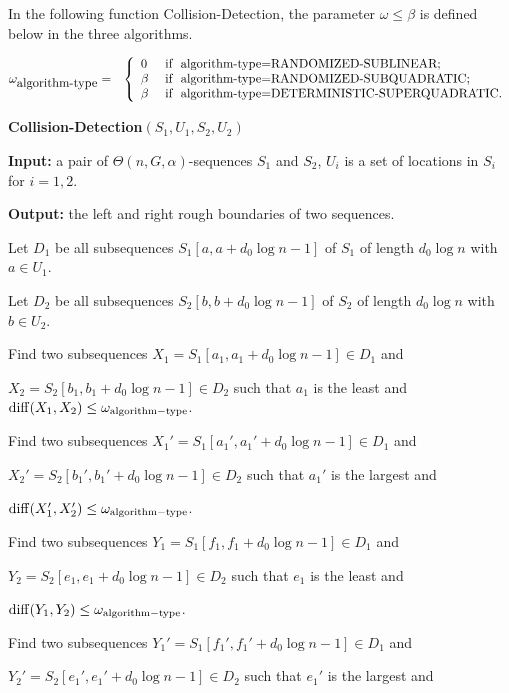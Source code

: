 \documentclass[11pt]{article}
\newcommand{\diff}{{\rm diff}}
\newcommand{\algtype}{{\rm algorithm-type}}
\newcommand{\sublinear}{{\rm RANDOMIZED-SUBLINEAR}}
\newcommand{\randomized}{{\rm RANDOMIZED-SUBQUADRATIC}}
\newcommand{\deterministic}{{\rm DETERMINISTIC-SUPERQUADRATIC}}
\begin{document}
In the following function Collision-Detection, the parameter
$\omega\le \beta$ is defined below in the three  algorithms.

\begin{eqnarray}
\omega_{\mbox{\algtype}}&=& \left\{ \begin{array}{ll}
                0 & \mbox{\ if \ } \mbox{\algtype=\sublinear;}\\
                \beta & \mbox{\ if \ }\mbox{\algtype=\randomized;}\\
                 \beta & \mbox{\ if \ }\mbox{\algtype=\deterministic.}\\
          \end{array}
          \right.
\end{eqnarray}

\vskip 10pt {\bf Collision-Detection$(S_1, U_1, S_2, U_2)$}

{\bf Input:} a pair of $\Theta(n,G,\alpha)$-sequences $S_1$ and
$S_2$, $U_i$ is a set of locations in $S_i$ for $i=1,2$.


{\bf Output:} the left and right rough boundaries of two sequences.


\qquad Let $D_1$ be all subsequences $S_1[a,a+d_0\log n-1]$ of $S_1$
of length $d_0\log n$ with $a\in U_1$.

\qquad Let $D_2$ be all subsequences $S_2[b,b+d_0\log n-1]$ of $S_2$
of length $d_0\log n$ with $b\in U_2$.



\qquad Find two  subsequences $X_1=S_1[a_1,a_1+d_0\log n-1]\in D_1$
and

\qquad $X_2=S_2[b_1,b_1+d_0\log n-1]\in D_2$ such that $a_1$ is the
least and $\diff(X_1,X_2)\le \omega_{\algtype}$.

\qquad Find two subsequences $X_1'=S_1[a_1',a_1'+d_0\log n-1]\in
D_1$ and

\qquad $X_2'=S_2[b_1',b_1'+d_0\log n-1]\in D_2$ such that $a_1'$ is
the largest and

\qquad $\diff(X_1',X_2')\le \omega_{\algtype}$.

\qquad Find two  subsequences $Y_1=S_1[f_1,f_1+d_0\log n-1]\in D_1$
and

\qquad $Y_2=S_2[e_1,e_1+d_0\log n-1]\in D_2$ such that $e_1$ is the
least and

\qquad $\diff(Y_1,Y_2)\le \omega_{\algtype}$.

\qquad Find two subsequences $Y_1'=S_1[f_1',f_1'+d_0\log n-1]\in
D_1$ and

\qquad $Y_2'=S_2[e_1',e_1'+d_0\log n-1]\in D_2$ such that $e_1'$ is
the largest and
\end{document}
